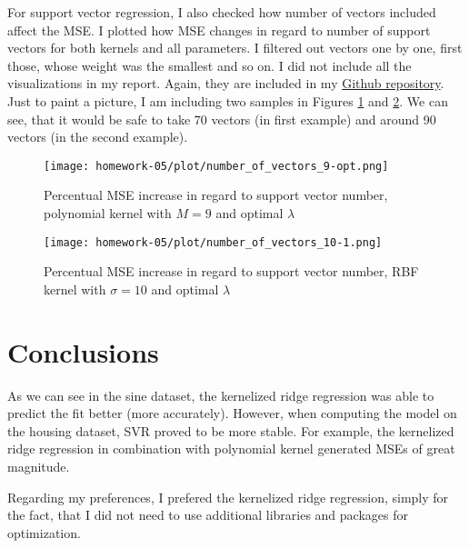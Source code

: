 \documentclass{article}
\begin{document}
For support vector regression, I also checked how number of vectors included affect the MSE. I plotted how MSE changes in regard to number of support vectors for both kernels and all parameters. I filtered out vectors one by one, first those, whose weight was the smallest and so on. I did not include all the visualizations in my report. Again, they are included in my \href{https://github.com/majbc1999/ml-for-data-science-homeworks} {Github repository}. Just to paint a picture, I am including two samples in Figures \ref{fig:SVR_number1} and \ref{fig:SVR_number2}. We can see, that it would be safe to take 70 vectors (in first example) and around 90 vectors (in the second example).

\begin{figure}[!h]
    \centering
    \texttt{[image: homework-05/plot/number\_of\_vectors\_9-opt.png]}
    \caption{Percentual MSE increase in regard to support vector number, polynomial kernel with $M = 9$ and optimal $\lambda$}
    \label{fig:SVR_number1}
\end{figure}

\begin{figure}[!h]
    \centering
    \texttt{[image: homework-05/plot/number\_of\_vectors\_10-1.png]}
    \caption{Percentual MSE increase in regard to support vector number, RBF kernel with $\sigma = 10$ and optimal $\lambda$}
    \label{fig:SVR_number2}
\end{figure}

\section{Conclusions}
As we can see in the sine dataset, the kernelized ridge regression was able to predict the fit better (more accurately). However, when computing the model on the housing dataset, SVR proved to be more stable. For example, the kernelized ridge regression in combination with polynomial kernel generated MSEs of great magnitude. 

Regarding my preferences, I prefered the kernelized ridge regression, simply for the fact, that I did not need to use additional libraries and packages for optimization.

\printbibliography
\end{document}
